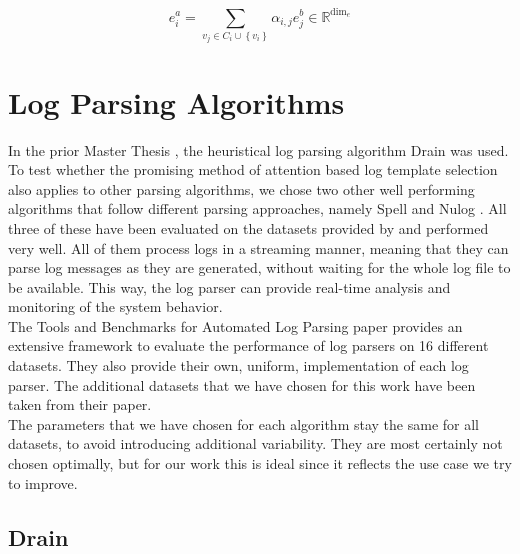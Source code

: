 \begin{equation}
    e_i^a=\sum_{v_j \in C_i \cup\left\{v_i\right\}} \alpha_{i, j} e_j^b \in \mathbb{R}^{\operatorname{dim}_e}
\end{equation}

\section{Log Parsing Algorithms}
\label{sec:Methods:Algorithms}
In the prior Master Thesis \cite{witterauf2021domainml}, the heuristical log parsing algorithm Drain \cite{drain} was used. To test whether the promising method of attention based log template selection also applies to other parsing algorithms, we chose two other well performing algorithms that follow different parsing approaches, namely Spell \cite{spell} and Nulog \cite{nedelkoski2020selfsupervised}. All three of these have been evaluated on the datasets provided by \cite{zhu2019tools} and performed very well. All of them process logs in a streaming manner, meaning that they can  parse log messages as they are generated, without waiting for the whole log file to be available. This way, the log parser can provide real-time analysis and monitoring of the system behavior. \\

The Tools and Benchmarks for Automated Log Parsing paper \cite{zhu2019tools} provides an extensive framework to evaluate the performance of log parsers on 16 different datasets. They also provide their own, uniform, implementation of each log parser. The additional datasets that we have chosen for this work have been taken from their paper. \\

The parameters that we have chosen for each algorithm stay the same for all datasets, to avoid introducing additional variability. They are most certainly not chosen optimally, but for our work this is ideal since it reflects the use case we try to improve.

\subsection{Drain}
\label{sec:Methods:Algorithms:Drain}

